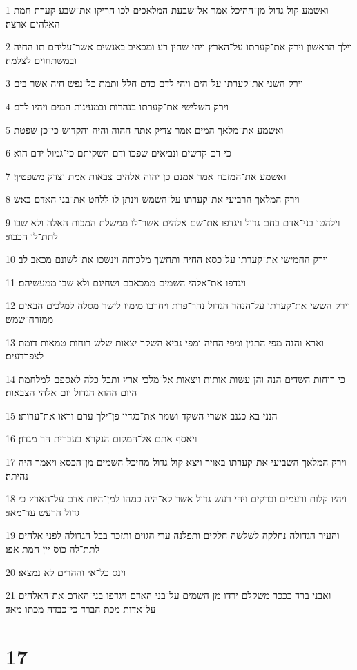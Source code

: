 \par 1 ואשמע קול גדול מן־ההיכל אמר אל־שבעת המלאכים לכו הריקו את־שבע קערת חמת האלהים ארצה׃
\par 2 וילך הראשון וירק את־קערתו על־הארץ ויהי שחין רע ומכאיב באנשים אשר־עליהם תו החיה ובמשתחוים לצלמה׃
\par 3 וירק השני את־קערתו על־הים ויהי לדם כדם חלל ותמת כל־נפש חיה אשר בים׃
\par 4 וירק השלישי את־קערתו בנהרות ובמעינות המים ויהיו לדם׃
\par 5 ואשמע את־מלאך המים אמר צדיק אתה ההוה והיה והקדוש כי־כן שפטת׃
\par 6 כי דם קדשים ונביאים שפכו ודם השקיתם כי־גמול ידם הוא׃
\par 7 ואשמע את־המזבח אמר אמנם כן יהוה אלהים צבאות אמת וצדק משפטיך׃
\par 8 וירק המלאך הרביעי את־קערתו על־השמש וינתן לו ללהט את־בני האדם באש׃
\par 9 וילהטו בני־אדם בחם גדול ויגדפו את־שם אלהים אשר־לו ממשלת המכות האלה ולא שבו לתת־לו הכבוד׃
\par 10 וירק החמישי את־קערתו על־כסא החיה ותחשך מלכותה וינשכו את־לשונם מכאב לב׃
\par 11 ויגדפו את־אלהי השמים ממכאבם ושחינם ולא שבו ממעשיהם׃
\par 12 וירק הששי את־קערתו על־הנהר הגדול נהר־פרת ויחרבו מימיו לישר מסלה למלכים הבאים ממזרח־שמש׃
\par 13 וארא והנה מפי התנין ומפי החיה ומפי נביא השקר יצאות שלש רוחות טמאות דומת לצפרדעים׃
\par 14 כי רוחות השדים הנה והן עשות אותות ויצאות אל־מלכי ארץ ותבל כלה לאספם למלחמת היום ההוא הגדול יום אלהי הצבאות׃
\par 15 הנני בא כגנב אשרי השקד ושמר את־בגדיו פן־ילך ערם וראו את־ערותו׃
\par 16 ויאסף אתם אל־המקום הנקרא בעברית הר מגדון׃
\par 17 וירק המלאך השביעי את־קערתו באויר ויצא קול גדול מהיכל השמים מן־הכסא ויאמר היה נהיתה׃
\par 18 ויהיו קלות ורעמים וברקים ויהי רעש גדול אשר לא־היה כמהו למן־היות אדם על־הארץ כי גדול הרעש עד־מאד׃
\par 19 והעיר הגדולה נחלקה לשלשה חלקים ותפלנה ערי הגוים ותזכר בבל הגדולה לפני אלהים לתת־לה כוס יין חמת אפו׃
\par 20 וינס כל־אי וההרים לא נמצאו׃
\par 21 ואבני ברד כככר משקלם ירדו מן השמים על־בני האדם ויגדפו בני־האדם את־האלהים על־אדות מכת הברד כי־כבדה מכתו מאד׃

\chapter{17}

